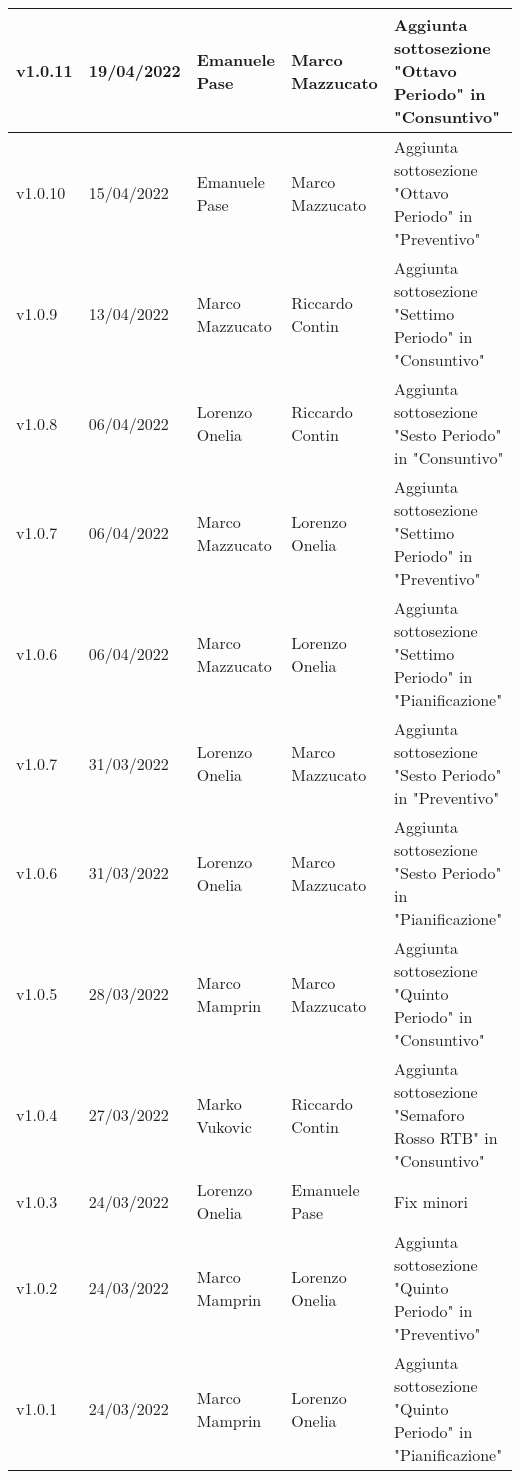 {\begin{longtable}{|C{1.8cm}|C{2.1cm}|C{2cm}|C{2.4cm}|L{4.4cm}|}
  v1.0.11       & 19/04/2022    & Emanuele Pase   &  Marco Mazzucato   & Aggiunta sottosezione "Ottavo Periodo" in "Consuntivo" \\ \hline
  v1.0.10       & 15/04/2022    & Emanuele Pase   &  Marco Mazzucato   & Aggiunta sottosezione "Ottavo Periodo" in "Preventivo" \\ \hline
  v1.0.9        & 13/04/2022    & Marco Mazzucato   &  Riccardo Contin   & Aggiunta sottosezione "Settimo Periodo" in "Consuntivo" \\ \hline
  v1.0.8        & 06/04/2022    & Lorenzo Onelia   &  Riccardo Contin    & Aggiunta sottosezione "Sesto Periodo" in "Consuntivo" \\ \hline
  v1.0.7        & 06/04/2022    & Marco Mazzucato   &   Lorenzo Onelia   & Aggiunta sottosezione "Settimo Periodo" in "Preventivo" \\ \hline
  v1.0.6        & 06/04/2022    & Marco Mazzucato   &  Lorenzo Onelia    & Aggiunta sottosezione "Settimo Periodo" in "Pianificazione" \\ \hline
  v1.0.7        & 31/03/2022    & Lorenzo Onelia   &  Marco Mazzucato    & Aggiunta sottosezione "Sesto Periodo" in "Preventivo" \\ \hline
  v1.0.6        & 31/03/2022    & Lorenzo Onelia   &   Marco Mazzucato   & Aggiunta sottosezione "Sesto Periodo" in "Pianificazione" \\ \hline
  v1.0.5        & 28/03/2022    & Marco Mamprin   &  Marco Mazzucato    & Aggiunta sottosezione "Quinto Periodo" in "Consuntivo" \\ \hline
  v1.0.4        & 27/03/2022    & Marko Vukovic   &  Riccardo Contin    & Aggiunta sottosezione "Semaforo Rosso RTB" in "Consuntivo" \\ \hline
  v1.0.3        & 24/03/2022    & Lorenzo Onelia  & Emanuele Pase    & Fix minori                  \\ \hline
  v1.0.2        & 24/03/2022    & Marco Mamprin   &  Lorenzo Onelia    & Aggiunta sottosezione "Quinto Periodo" in "Preventivo" \\ \hline
  v1.0.1        & 24/03/2022    & Marco Mamprin   &  Lorenzo Onelia    & Aggiunta sottosezione "Quinto Periodo" in "Pianificazione" \\ \hline

\end{longtable}}
